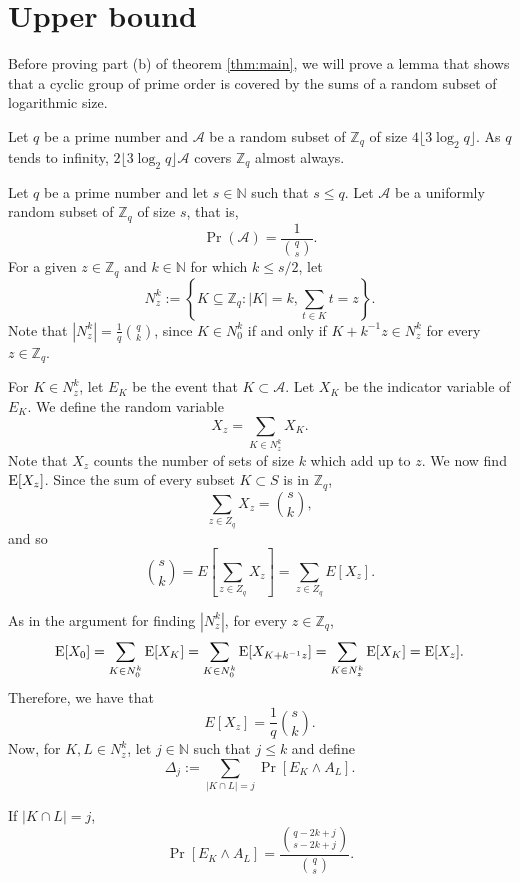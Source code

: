 \section{Upper bound}\label{sec:results:upperbound}
Before proving part (b) of theorem \ref{thm:main}, we will prove a lemma that shows that a cyclic group of prime order is covered by the sums of a random subset of logarithmic size.  
\begin{lemma}\label{lem:sumset}
    Let $q$ be a prime number and $\mathcal{A}$ be a random subset of $\mathbb{Z}_q$ of size $4\lfloor3\log_2 q\rfloor$. As $q$ tends to infinity, $2\lfloor3\log_2 q\rfloor \mathcal{A}$ covers $\mathbb{Z}_q$ almost always. 
\end{lemma}

Let $q$ be a prime number and let $s \in \mathbb{N}$ such that $s\leq q$. Let $\mathcal{A}$ be a uniformly random subset of $\mathbb{Z}_q$ of size $s$, that is, 
\[\Pr(\mathcal{A}) = \frac{1}{\binom{q}{s}}.\]
For a given $z \in \mathbb{Z}_q$ and $k \in \mathbb{N}$ for which $k \leq s/2$, let 
\[N_z^k := \left\{K \subseteq \mathbb{Z}_q: |K| = k, \sum_{t \in K} t = z\right\}.\]
Note that $|N_z^k| = \frac{1}{q}{\binom{q}{k}}$, since $K \in N_0^k$ if and only if $K + k^{-1}z \in N_z^k$ for every $z \in \mathbb{Z}_q$.\par
For $K \in N_z^k$, let $E_K$ be the event that $K \subset\mathcal{A}$. Let $X_K$ be the indicator variable of $E_K$.
We define the random variable 
\[X_z = \sum_{K \in N_z^k} X_K.\]
Note that $X_z$ counts the number of sets of size $k$ which add up to $z$. We now find $\mathrm{E}[X_z]$. Since the sum of every subset $K \subset S$ is in $\mathbb{Z}_q$,
\[\sum_{z \in Z_q} X_z = {\binom{s}{k}},\]
and so
\[\binom{s}{k} = E\left[\sum_{z \in Z_q} X_z\right] =  \sum_{z \in Z_q} E[X_z].\]\par
As in the argument for finding $|N_z^k|$, for every $z \in \mathbb{Z}_q$, 
\[\mathrm{E}[X_0] = \sum_{K \in N_0^k}\mathrm{E}[X_K] = \sum_{K \in N_0^k} \mathrm{E}[X_{K + k^{-1}z}] = \sum_{K \in N_z^k} \mathrm{E}[X_K] = \mathrm{E}[X_z].\]
Therefore, we have that
\begin{equation}\label{eq:upperbound:expected}
E[X_z] = \frac{1}{q} {\binom{s}{k}}.
\end{equation}
Now, for $K, L \in N_z^k$, let $j \in \mathbb{N}$ such that $j \leq k$ and define
\[\Delta_j := \sum_{|K \cap L| = j} \Pr[E_K \land A_L].\]
\par 
If $|K \cap L| = j$,
\[\Pr[E_K \land A_L] = \frac{\binom{q - 2k + j}{s - 2k + j}}{\binom{q}{s}}.\]
\par
